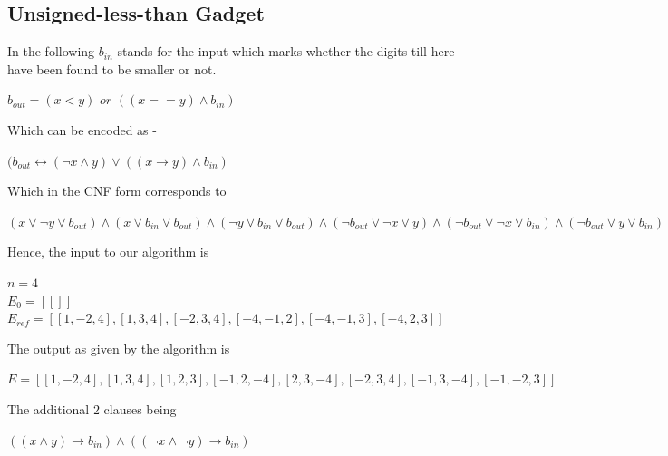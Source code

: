 \documentclass{article}
\theoremstyle{plain}
\begin{document}
\subsection{Unsigned-less-than Gadget}
In the following $b_{in}$ stands for the input which marks whether the digits till here have been found to be smaller or not.
\begin{center}
$b_{out} = (x < y)$ $or$ $((x == y) \wedge b_{in})$   
\end{center}
Which can be encoded as -
\begin{center}
$ (b_{out} \longleftrightarrow (\neg x \wedge y) \vee ((x \longrightarrow y) \wedge b_{in})$  
\end{center}
Which in the CNF form corresponds to
\begin{center}
$(x \vee \neg y \vee b_{out}) \wedge (x \vee b_{in} \vee b_{out}) \wedge (\neg y \vee b_{in} \vee b_{out}) \wedge (\neg b_{out} \vee \neg x \vee y) \wedge (\neg b_{out} \vee \neg x \vee b_{in}) \wedge (\neg b_{out} \vee y \vee b_{in})$
\end{center}
Hence, the input to our algorithm is
\begin{center}
$n = 4$\\
$E_0 = [[]]$ \\
$E_{ref} = [[1,-2,4],[1,3,4],[-2,3,4],[-4,-1,2],[-4,-1,3],[-4,2,3]]$
\end{center}
The output as given by the algorithm is 
\begin{center}
$E = [[1,-2,4],[1,3,4],[1,2,3],[-1,2,-4],[2,3,-4],[-2,3,4],[-1,3,-4],[-1,-2,3]]$
\end{center}
The additional $2$ clauses being 
\begin{center}
$((x \wedge y) \longrightarrow b_{in}) \wedge ((\neg x \wedge \neg y) \longrightarrow b_{in})$
\end{center}
\nocite{*}


\end{document}
